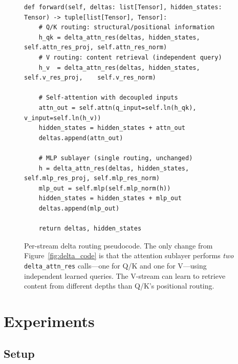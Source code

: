 \documentclass{article}
\begin{document}
\begin{figure}[t]
\begin{lstlisting}[style=python]
def forward(self, deltas: list[Tensor], hidden_states: Tensor) -> tuple[list[Tensor], Tensor]:
    # Q/K routing: structural/positional information
    h_qk = delta_attn_res(deltas, hidden_states, self.attn_res_proj, self.attn_res_norm)
    # V routing: content retrieval (independent query)
    h_v  = delta_attn_res(deltas, hidden_states, self.v_res_proj,    self.v_res_norm)

    # Self-attention with decoupled inputs
    attn_out = self.attn(q_input=self.ln(h_qk), v_input=self.ln(h_v))
    hidden_states = hidden_states + attn_out
    deltas.append(attn_out)

    # MLP sublayer (single routing, unchanged)
    h = delta_attn_res(deltas, hidden_states, self.mlp_res_proj, self.mlp_res_norm)
    mlp_out = self.mlp(self.mlp_norm(h))
    hidden_states = hidden_states + mlp_out
    deltas.append(mlp_out)

    return deltas, hidden_states
\end{lstlisting}
\caption{Per-stream delta routing pseudocode. The only change from Figure~\ref{fig:delta_code} is that the attention sublayer performs \emph{two} \texttt{delta\_attn\_res} calls---one for Q/K and one for V---using independent learned queries. The V-stream can learn to retrieve content from different depths than Q/K's positional routing.}
\label{fig:delta_v_code}
\end{figure}

\section{Experiments}
\label{sec:experiments}

\subsection{Setup}
\end{document}

